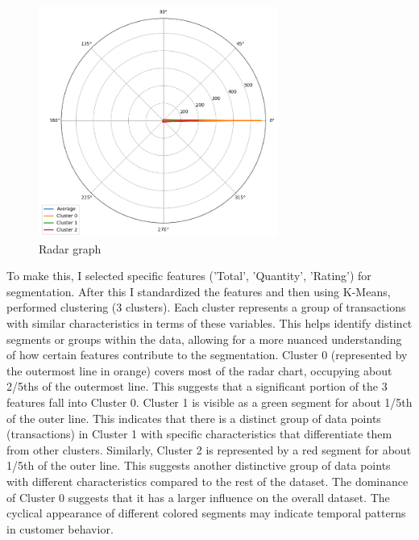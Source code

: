 \begin{figure}[h]
    \centering
    \includegraphics[width=0.7\textwidth]{Chapters/ch3/ch_3_spiral.png}
    \caption{Radar graph}
\end{figure}
\newpage
To make this, I selected specific features ('Total', 'Quantity', 'Rating') for segmentation. After this I standardized the features and then using K-Means, performed clustering (3 clusters). Each cluster represents a group of transactions with similar characteristics in terms of these variables. This helps identify distinct segments or groups within the data, allowing for a more nuanced understanding of how certain features contribute to the segmentation. Cluster 0 (represented by the outermost line in orange) covers most of the radar chart, occupying about 2/5ths of the outermost line. This suggests that a significant portion of the 3 features fall into Cluster 0. Cluster 1 is visible as a green segment for about 1/5th of the outer line. This indicates that there is a distinct group of data points (transactions) in Cluster 1 with specific characteristics that differentiate them from other clusters. Similarly, Cluster 2 is represented by a red segment for about 1/5th of the outer line. This suggests another distinctive group of data points with different characteristics compared to the rest of the dataset. The dominance of Cluster 0 suggests that it has a larger influence on the overall dataset. The cyclical appearance of different colored segments may indicate temporal patterns in customer behavior.

